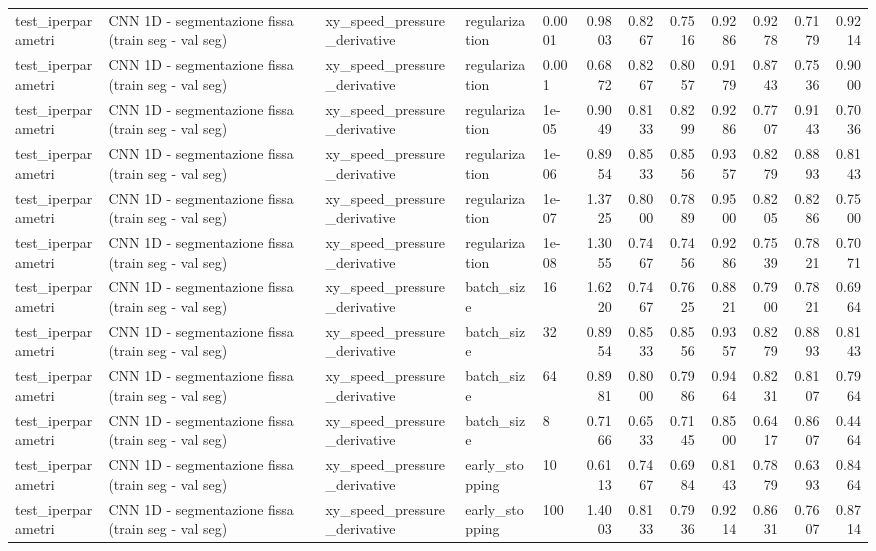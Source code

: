 \documentclass{article}
\begin{document}
\begin{table}[htbp]
\begin{adjustbox}{max width=\textwidth}
\begin{tabular}{lllllrrrrrrr}
test\_iperparametri & CNN 1D - segmentazione fissa (train seg - val seg) & xy\_speed\_pressure\_derivative & regularization & 0.0001 & 0.9803 & 0.8267 & 0.7516 & 0.9286 & 0.9278 & 0.7179 & 0.9214 \\
test\_iperparametri & CNN 1D - segmentazione fissa (train seg - val seg) & xy\_speed\_pressure\_derivative & regularization & 0.001 & 0.6872 & 0.8267 & 0.8057 & 0.9179 & 0.8743 & 0.7536 & 0.9000 \\
test\_iperparametri & CNN 1D - segmentazione fissa (train seg - val seg) & xy\_speed\_pressure\_derivative & regularization & 1e-05 & 0.9049 & 0.8133 & 0.8299 & 0.9286 & 0.7707 & 0.9143 & 0.7036 \\
test\_iperparametri & CNN 1D - segmentazione fissa (train seg - val seg) & xy\_speed\_pressure\_derivative & regularization & 1e-06 & 0.8954 & 0.8533 & 0.8556 & 0.9357 & 0.8279 & 0.8893 & 0.8143 \\
test\_iperparametri & CNN 1D - segmentazione fissa (train seg - val seg) & xy\_speed\_pressure\_derivative & regularization & 1e-07 & 1.3725 & 0.8000 & 0.7889 & 0.9500 & 0.8205 & 0.8286 & 0.7500 \\
test\_iperparametri & CNN 1D - segmentazione fissa (train seg - val seg) & xy\_speed\_pressure\_derivative & regularization & 1e-08 & 1.3055 & 0.7467 & 0.7456 & 0.9286 & 0.7539 & 0.7821 & 0.7071 \\
test\_iperparametri & CNN 1D - segmentazione fissa (train seg - val seg) & xy\_speed\_pressure\_derivative & batch\_size & 16 & 1.6220 & 0.7467 & 0.7625 & 0.8821 & 0.7900 & 0.7821 & 0.6964 \\
test\_iperparametri & CNN 1D - segmentazione fissa (train seg - val seg) & xy\_speed\_pressure\_derivative & batch\_size & 32 & 0.8954 & 0.8533 & 0.8556 & 0.9357 & 0.8279 & 0.8893 & 0.8143 \\
test\_iperparametri & CNN 1D - segmentazione fissa (train seg - val seg) & xy\_speed\_pressure\_derivative & batch\_size & 64 & 0.8981 & 0.8000 & 0.7986 & 0.9464 & 0.8231 & 0.8107 & 0.7964 \\
test\_iperparametri & CNN 1D - segmentazione fissa (train seg - val seg) & xy\_speed\_pressure\_derivative & batch\_size & 8 & 0.7166 & 0.6533 & 0.7145 & 0.8500 & 0.6417 & 0.8607 & 0.4464 \\
test\_iperparametri & CNN 1D - segmentazione fissa (train seg - val seg) & xy\_speed\_pressure\_derivative & early\_stopping & 10 & 0.6113 & 0.7467 & 0.6984 & 0.8143 & 0.7879 & 0.6393 & 0.8464 \\
test\_iperparametri & CNN 1D - segmentazione fissa (train seg - val seg) & xy\_speed\_pressure\_derivative & early\_stopping & 100 & 1.4003 & 0.8133 & 0.7936 & 0.9214 & 0.8631 & 0.7607 & 0.8714 \\

\end{tabular}
\end{adjustbox}
\end{table}
\end{document}

